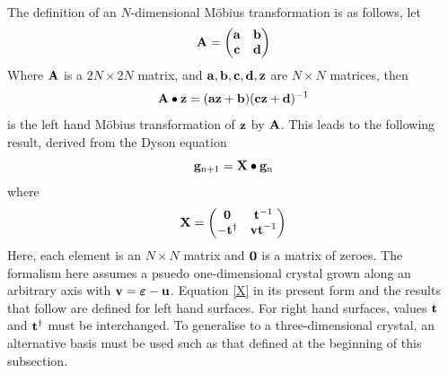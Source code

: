 \documentclass[a4paper, 12pt]{article}
\begin{document}
	\\[2mm] The definition of an $N$-dimensional M\"{o}bius transformation is as follows, let
\begin{equation}
\bf{A} = \begin{pmatrix} \bf{a}&\bf{b}\\ \bf{c}&\bf{d} \end{pmatrix}
\end{equation}
Where $\bf{A}$ is a $2N \times 2N$ matrix, and $\bf{a}, \bf{b}, \bf{c}, \bf{d}, \bf{z}$ are $N \times N$ matrices, then
\begin{equation}\label{LHMT}
\bf{A \bullet z} = (\bf{az} + \bf{b})(\bf{cz} + \bf{d})^{\rm -1}
\end{equation}
is the left hand M\"{o}bius transformation of $\bf z$ by $\bf A$.
This leads to the following result, derived from the Dyson equation
\begin{equation}
	{\bf g}_{{\rm n}+1} = {\bf X}\bullet {\bf g}_{\rm n}
\end{equation}
where
\begin{equation}\label{X}
	\bf{X} = \begin{pmatrix} \bf0&\bf{t}^{\rm{-1}}\\-\bf{t}^{\rm{\dag}}&\bf{vt}^{\rm{-1}} \end{pmatrix}
\end{equation}
Here, each element is an $N \times N$ matrix and $\bf{0}$ is a matrix of zeroes. The formalism here assumes a psuedo one-dimensional crystal grown along an arbitrary axis with ${\bf v} = \bm\varepsilon - {\bf u}$. Equation \eqref{X} in its present form and the results that follow are defined for left hand surfaces. For right hand surfaces, values $\bf{t}$ and $\bf{t}^{\rm{\dag}}$ must be interchanged.
To generalise to a three-dimensional crystal, an alternative basis must be used such as that defined at the beginning of this subsection.

\end{document}
